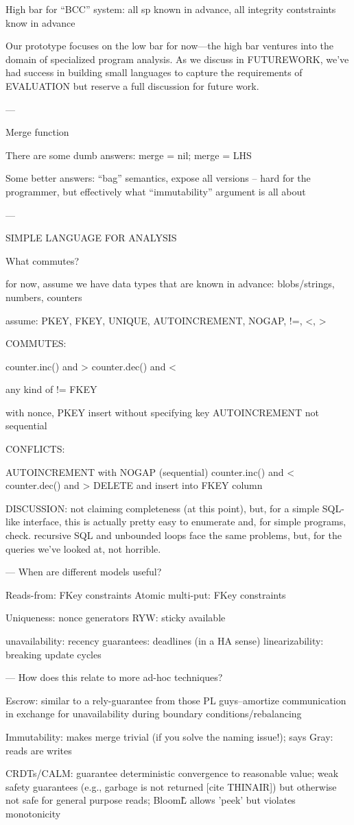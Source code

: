High bar for ``BCC'' system: all sp known in advance, all integrity contstraints know in advance

Our prototype focuses on the low bar for now---the high bar ventures into the domain of specialized program analysis. As we discuss in FUTUREWORK, we've had success in building small languages to capture the requirements of EVALUATION but reserve a full discussion for future work.

---

Merge function

There are some dumb answers: merge = nil; merge = LHS

Some better answers:
``bag'' semantics, expose all versions -- hard for the programmer, but effectively what ``immutability'' argument is all about

---

SIMPLE LANGUAGE FOR ANALYSIS

What commutes?

for now, assume we have data types that are known in advance: blobs/strings, numbers, counters

assume: PKEY, FKEY, UNIQUE, AUTOINCREMENT, NOGAP, !=, <, >

COMMUTES: 

counter.inc() and >
counter.dec() and <

any kind of !=
FKEY

with nonce, PKEY insert without specifying key
AUTOINCREMENT not sequential

CONFLICTS:

AUTOINCREMENT with NOGAP (sequential)
counter.inc() and <
counter.dec() and >
DELETE and insert into FKEY column


DISCUSSION: not claiming completeness (at this point), but, for a
simple SQL-like interface, this is actually pretty easy to enumerate
and, for simple programs, check. recursive SQL and unbounded loops
face the same problems, but, for the queries we've looked at, not
horrible.

---
When are different models useful?

Reads-from: FKey constraints
Atomic multi-put: FKey constraints

Uniqueness: nonce generators
RYW: sticky available

unavailability:
recency guarantees: deadlines (in a HA sense)
linearizability: breaking update cycles

---
How does this relate to more ad-hoc techniques?

Escrow: similar to a rely-guarantee from those PL guys--amortize
communication in exchange for unavailability during boundary
conditions/rebalancing

Immutability: makes merge trivial (if you solve the naming issue!);
says Gray: reads are writes

CRDTs/CALM: guarantee deterministic convergence to reasonable value;
weak safety guarantees (e.g., garbage is not returned [cite THINAIR])
but otherwise not safe for general purpose reads; Bloom\^L allows
'peek' but violates monotonicity
